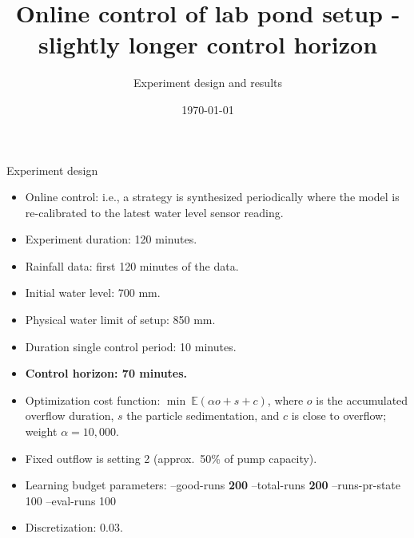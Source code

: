 \documentclass[notheorems,aspectratio=169]{beamer}
\title{Online control of lab pond setup - slightly longer control horizon}
\subtitle{Experiment design and results}
\date{\today}
\begin{document}
%
\begin{frame}
	\titlepage
\end{frame}
%

\begin{frame}{Experiment design}
	\small
	\begin{itemize}
		\item Online control: i.e., a strategy is synthesized periodically where the model is re-calibrated to the latest water level sensor reading.
		\item Experiment duration: 120 minutes.
		\item Rainfall data: first 120 minutes of the data.
		\item Initial water level: 700 mm.
		\item Physical water limit of setup: 850 mm.
		\item Duration single control period: 10 minutes.
		\item \textbf{Control horizon: 70 minutes.}
		\item Optimization cost function: $\min\  \mathbb{E}(\alpha o + s + c)$, where $o$ is the accumulated overflow duration, $s$ the particle sedimentation, and $c$ is close to overflow; weight $\alpha = 10,000$.
		\item Fixed outflow is setting 2 (approx.\ 50\% of pump capacity).
		\item Learning budget parameters: --good-runs \textbf{200} --total-runs \textbf{200} --runs-pr-state 100 --eval-runs 100 
		\item Discretization: 0.03.
	\end{itemize}
\end{frame}
	
\end{document}
